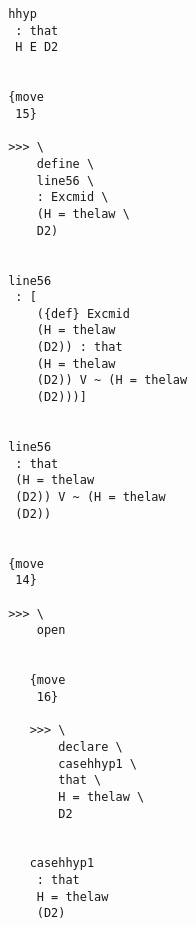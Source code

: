 \documentclass[12pt]{article}
\begin{document}
\begin{verbatim}
                                             hhyp 
                                              : that 
                                              H E D2


                                             {move 
                                              15}

                                             >>> \
                                                 define \
                                                 line56 \
                                                 : Excmid \
                                                 (H = thelaw \
                                                 D2)


                                             line56 
                                              : [
                                                 ({def} Excmid 
                                                 (H = thelaw 
                                                 (D2)) : that 
                                                 (H = thelaw 
                                                 (D2)) V ~ (H = thelaw 
                                                 (D2)))]


                                             line56 
                                              : that 
                                              (H = thelaw 
                                              (D2)) V ~ (H = thelaw 
                                              (D2))


                                             {move 
                                              14}

                                             >>> \
                                                 open


                                                {move 
                                                 16}

                                                >>> \
                                                    declare \
                                                    casehhyp1 \
                                                    that \
                                                    H = thelaw \
                                                    D2


                                                casehhyp1 
                                                 : that 
                                                 H = thelaw 
                                                 (D2)



\end{verbatim}
\end{document}

